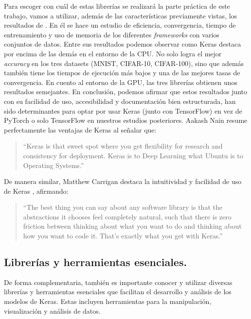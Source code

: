 Para escoger con cuál de estas librerías se realizará la parte práctica de este trabajo, vamos a utilizar, además de las características previamente vistas, los resultados de \citep{mahmoud2019dlbench}. En él se hace un estudio de eficiencia, convergencia, tiempo de entrenamiento y uso de memoria de los diferentes \textit{frameworks} con varios conjuntos de datos. Entre sus resultados podemos observar como Keras destaca por encima de las demás en el entorno de la CPU. No solo logra el mejor \textit{accuracy} en los tres datasets (MNIST, CIFAR-10, CIFAR-100), sino que además también tiene los tiempos de ejecución más bajos y una de las mejores tasas de convergencia. En cuento al entorno de la GPU, las tres librerías obtienen unos resultados semejantes. En conclusión, podemos afirmar que estos resultados junto con su facilidad de uso, accesibilidad y documentación bien estructurada, han sido determinantes para optar por usar Keras (junto con TensorFlow) en vez de PyTorch o solo TensorFlow en nuestros estudios posteriores. Aakash Nain resume perfectamente las ventajas de Keras \citep{keraswebsite2} al señalar que:

\begin{quote} 
``Keras is that sweet spot where you get flexibility for research and consistency for deployment. Keras is to Deep Learning what Ubuntu is to Operating Systems.'' 
\end{quote}

De manera similar, Matthew Carrigan destaca la intuitividad y facilidad de uso de Keras \citep{keraswebsite}, afirmando:

\begin{quote}
``The best thing you can say about any software library is that the abstractions it chooses feel completely natural, such that there is zero friction between thinking about what you want to do and thinking about how you want to code it. That's exactly what you get with Keras.''
\end{quote}


\subsection{Librerías y herramientas esenciales.} \label{sec:2.3.2}

De forma complementaria, también es importante conocer y utilizar diversas librerías y herramientas esenciales que facilitan el desarrollo y análisis de los modelos de Keras. Estas incluyen herramientas para la manipulación, visualización y análisis de datos.


